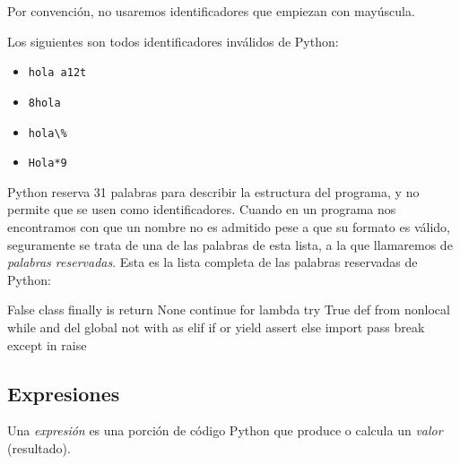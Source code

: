 \begin{observacion}
Por convención, no usaremos identificadores que empiezan con mayúscula.
\end{observacion}

Los siguientes son todos identificadores inválidos de Python:

\begin{itemize}
\item \lstinline!hola a12t!
\item \lstinline!8hola!
\item \lstinline!hola\%!
\item \lstinline!Hola*9!
\end{itemize}

Python reserva 31 palabras para describir la estructura del
programa, y no permite que se usen como identificadores. Cuando en
un programa nos encontramos con que un nombre no es admitido pese
a que su formato es válido, seguramente se trata de una de las
palabras de esta lista, a la que llamaremos de \emph{palabras
reservadas}. Esta es la lista completa de las palabras reservadas de
Python:

\begin{codigo-nohl-sn}
False      class      finally    is         return
None       continue   for        lambda     try
True       def        from       nonlocal   while
and        del        global     not        with
as         elif       if         or         yield
assert     else       import     pass
break      except     in         raise
\end{codigo-nohl-sn}

\subsection{Expresiones}
Una \emph{expresión} es una porción de código Python que produce o
calcula un \emph{valor} (resultado).

